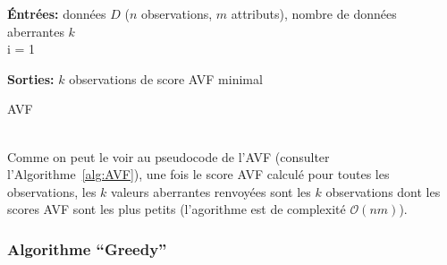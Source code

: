 \begin{algorithm}
\SetAlgoLined
\textbf{\'Entr\'ees:} donn\'ees $D$ ($n$ observations, $m$ attributs), nombre de donn\'ees aberrantes $k$ \\


i = 1


\textbf{Sorties:} $k$ observations de score AVF minimal
\caption{AVF}
\label{alg:AVF}
\end{algorithm}%

\ \\
\noindent Comme on peut le voir au pseudocode de l'AVF (consulter l'Algorithme~\ref{alg:AVF}), une fois le score AVF calculé pour toutes les observations, les $k$ valeurs aberrantes renvoyées sont les $k$ observations dont les scores AVF sont les plus petits (l'agorithme est de complexit\'e $\mathcal{O}(nm)$). 



\subsubsection*{Algorithme ``Greedy''}

